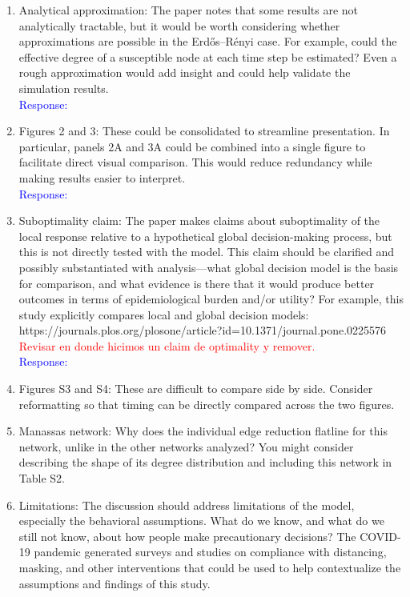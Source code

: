 \documentclass{article}
\newcommand{\blue}[1]{{\textcolor{blue}{#1}}}
\newcommand{\red}[1]{{\textcolor{red}{#1}}}
\begin{document}
\begin{enumerate}
    \item Analytical approximation: The paper notes that some results are not analytically tractable, but it would be worth considering whether approximations are possible in the Erdős–Rényi case. For example, could the effective degree of a susceptible node at each time step be estimated? Even a rough approximation would add insight and could help validate the simulation results.
    \blue{\\Response:
    }

    \item Figures 2 and 3: These could be consolidated to streamline presentation. In particular, panels 2A and 3A could be combined into a single figure to facilitate direct visual comparison. This would reduce redundancy while making results easier to interpret.
    \blue{\\Response:
    }

    \item Suboptimality claim: The paper makes claims about suboptimality of the local response relative to a hypothetical global decision-making process, but this is not directly tested with the model. This claim should be clarified and possibly substantiated with analysis—what global decision model is the basis for comparison, and what evidence is there that it would produce better outcomes in terms of epidemiological burden and/or utility? For example, this study explicitly compares local and global decision models: https://journals.plos.org/plosone/article?id=10.1371/journal.pone.0225576
    \red{Revisar en donde hicimos un claim de optimality y remover.}
    \blue{\\Response:
    }

    \item Figures S3 and S4: These are difficult to compare side by side. Consider reformatting so that timing can be directly compared across the two figures.

    \item Manassas network: Why does the individual edge reduction flatline for this network, unlike in the other networks analyzed? You might consider describing the shape of its degree distribution and including this network in Table S2.

    \item Limitations: The discussion should address limitations of the model, especially the behavioral assumptions. What do we know, and what do we still not know, about how people make precautionary decisions? The COVID-19 pandemic generated surveys and studies on compliance with distancing, masking, and other interventions that could be used to help contextualize the assumptions and findings of this study.
\end{enumerate}



\end{document}
